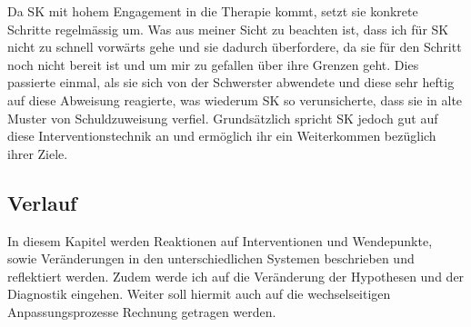 Da SK mit hohem Engagement in die Therapie kommt, setzt sie konkrete Schritte regelmässig um. Was aus meiner Sicht zu beachten ist, dass ich für SK nicht zu schnell vorwärts gehe und sie dadurch überfordere, da sie für den Schritt noch nicht bereit ist und um mir zu gefallen über ihre Grenzen geht. Dies passierte einmal, als sie sich von der Schwerster abwendete und diese sehr heftig auf diese Abweisung reagierte, was wiederum SK so verunsicherte, dass sie in alte Muster von Schuldzuweisung verfiel. Grundsätzlich spricht SK jedoch gut auf diese Interventionstechnik an und ermöglich ihr ein Weiterkommen bezüglich ihrer Ziele.

\subsection{Verlauf}\label{Verlauf} 
In diesem Kapitel werden Reaktionen auf Interventionen und Wendepunkte, sowie Veränderungen in den unterschiedlichen Systemen beschrieben und reflektiert werden. Zudem werde ich auf die Veränderung der Hypothesen und der Diagnostik eingehen. Weiter soll hiermit auch auf die wechselseitigen Anpassungsprozesse Rechnung getragen werden. 

